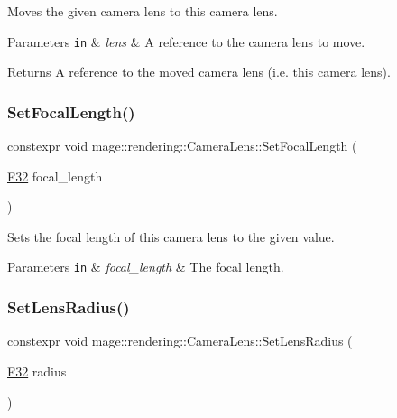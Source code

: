 Moves the given camera lens to this camera lens.


\begin{DoxyParams}[1]{Parameters}
\mbox{\tt in}  & {\em lens} & A reference to the camera lens to move. \\
\hline
\end{DoxyParams}
\begin{DoxyReturn}{Returns}
A reference to the moved camera lens (i.\+e. this camera lens). 
\end{DoxyReturn}
\mbox{\label{classmage_1_1rendering_1_1_camera_lens_ad954dd19be6f0cc54c74aecf29bb2134}} 
\subsubsection{\texorpdfstring{Set\+Focal\+Length()}{SetFocalLength()}}
{\footnotesize\ttfamily constexpr void mage\+::rendering\+::\+Camera\+Lens\+::\+Set\+Focal\+Length (\begin{DoxyParamCaption}\item[{\mbox{\hyperlink{namespacemage_aa97e833b45f06d60a0a9c4fc22ae02c0}{F32}}}]{focal\+\_\+length }\end{DoxyParamCaption})\hspace{0.3cm}{\ttfamily [noexcept]}}

Sets the focal length of this camera lens to the given value.


\begin{DoxyParams}[1]{Parameters}
\mbox{\tt in}  & {\em focal\+\_\+length} & The focal length. \\
\hline
\end{DoxyParams}
\mbox{\label{classmage_1_1rendering_1_1_camera_lens_ad7d28ba6b6e462711fb645020697f8ed}} 
\subsubsection{\texorpdfstring{Set\+Lens\+Radius()}{SetLensRadius()}}
{\footnotesize\ttfamily constexpr void mage\+::rendering\+::\+Camera\+Lens\+::\+Set\+Lens\+Radius (\begin{DoxyParamCaption}\item[{\mbox{\hyperlink{namespacemage_aa97e833b45f06d60a0a9c4fc22ae02c0}{F32}}}]{radius }\end{DoxyParamCaption})\hspace{0.3cm}{\ttfamily [noexcept]}}

